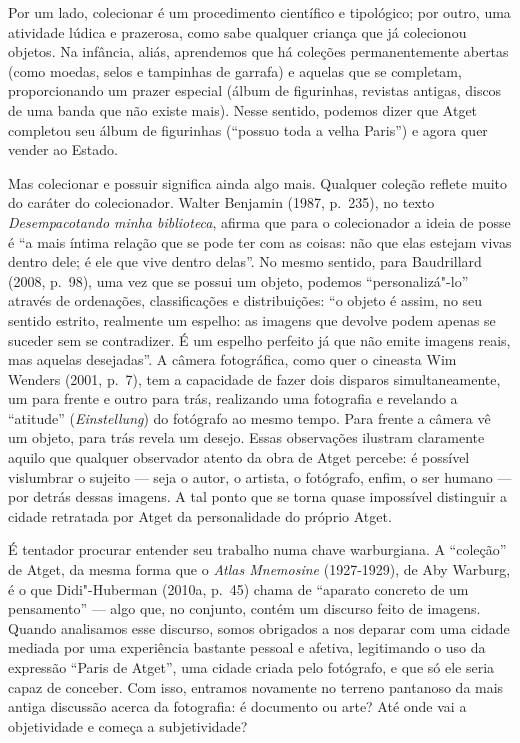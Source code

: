 Por um lado, colecionar é um procedimento científico e tipológico; por
outro, uma atividade lúdica e prazerosa, como sabe qualquer criança que
já colecionou objetos. Na infância, aliás, aprendemos que há coleções
permanentemente abertas (como moedas, selos e tampinhas de garrafa) e
aquelas que se completam, proporcionando um prazer especial (álbum de
figurinhas, revistas antigas, discos de uma banda que não existe mais).
Nesse sentido, podemos dizer que Atget completou seu álbum de figurinhas
(``possuo toda a velha Paris'') e agora quer vender ao Estado.

Mas colecionar e possuir significa ainda algo mais. Qualquer coleção
reflete muito do caráter do colecionador. Walter Benjamin (1987, p.~235), no texto \emph{Desempacotando minha biblioteca}, afirma que para o
colecionador a ideia de posse é ``a mais íntima relação que se pode ter
com as coisas: não que elas estejam vivas dentro dele; é ele que vive
dentro delas''. No mesmo sentido, para Baudrillard (2008, p.~98), uma
vez que se possui um objeto, podemos ``personalizá"-lo'' através de
ordenações, classificações e distribuições: ``o objeto é assim, no seu
sentido estrito, realmente um espelho: as imagens que devolve podem
apenas se suceder sem se contradizer. É um espelho perfeito já que não
emite imagens reais, mas aquelas desejadas''. A câmera fotográfica, como
quer o cineasta Wim Wenders (2001, p.~7), tem a capacidade de fazer dois
disparos simultaneamente, um para frente e outro para trás, realizando
uma fotografia e revelando a ``atitude'' (\emph{Einstellung}) do
fotógrafo ao mesmo tempo. Para frente a câmera vê um objeto, para trás
revela um desejo. Essas observações ilustram claramente aquilo que
qualquer observador atento da obra de Atget percebe: é possível
vislumbrar o sujeito --- seja o autor, o artista, o fotógrafo, enfim, o
ser humano --- por detrás dessas imagens. A tal ponto que se torna quase
impossível distinguir a cidade retratada por Atget da personalidade do
próprio Atget.

É tentador procurar entender seu trabalho numa chave warburgiana. A
``coleção'' de Atget, da mesma forma que o \emph{Atlas Mnemosine}
(1927-1929), de Aby Warburg, é o que Didi"-Huberman (2010a, p.~45) chama
de ``aparato concreto de um pensamento'' --- algo que, no conjunto,
contém um discurso feito de imagens. Quando analisamos esse discurso,
somos obrigados a nos deparar com uma cidade mediada por uma experiência
bastante pessoal e afetiva, legitimando o uso da expressão ``Paris de
Atget'', uma cidade criada pelo fotógrafo, e que só ele seria capaz de
conceber. Com isso, entramos novamente no terreno pantanoso da mais
antiga discussão acerca da fotografia: é documento ou arte? Até onde vai
a objetividade e começa a subjetividade?

